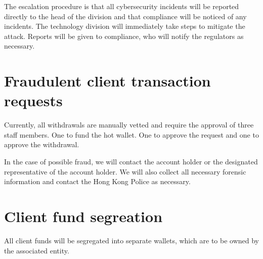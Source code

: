 The escalation procedure is that all cybersecurity incidents will be
reported directly to the head of the division and that compliance will
be noticed of any incidents.  The technology division will immediately
take steps to mitigate the attack.  Reports will be given to
compliance, who will notify the regulators as necessary.


\section{Fraudulent client transaction requests}
Currently, all withdrawals are manually vetted and require the approval
of three staff members.  One to fund the hot wallet.  One to approve
the request and one to approve the withdrawal.

In the case of possible fraud, we will contact the account holder or the
designated representative of the account holder.  We will also collect
all necessary forensic information and contact the Hong Kong Police as
necessary.


\section{Client fund segreation}
All client funds will be segregated into separate wallets, which are to
be owned by the associated entity.


